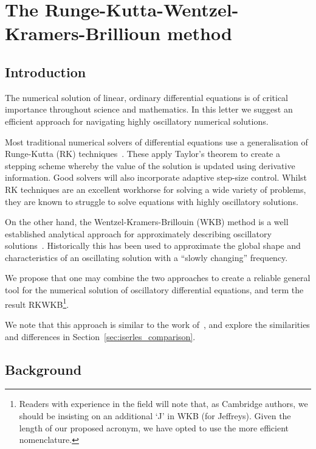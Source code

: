 

\chapter[RKWKB]{The Runge-Kutta-Wentzel-Kramers-Brillioun method}
\label{chap:RK}

\section{Introduction}
\label{sec:introduction}
The numerical solution of linear, ordinary differential equations is of critical importance throughout science and mathematics. In this letter we suggest an efficient approach for navigating highly oscillatory numerical solutions.

Most traditional numerical solvers of differential equations use a generalisation of Runge-Kutta (RK) techniques~\citep{Press+2007}. These apply Taylor's theorem to create a stepping scheme whereby the value of the solution is updated using derivative information. Good solvers will also incorporate adaptive step-size control.
Whilst RK techniques are an excellent workhorse for solving a wide variety of problems, they are known to struggle to solve equations with highly oscillatory solutions.

On the other hand, the Wentzel-Kramers-Brillouin (WKB) method is a well established analytical approach for approximately describing oscillatory solutions~\citep{RHB,Bender+2010}. Historically this has been used to approximate the global shape and characteristics of an oscillating solution with a ``slowly changing'' frequency.

We propose that one may combine the two approaches to create a reliable general tool for the numerical solution of oscillatory differential equations, and term the result RKWKB\footnote{Readers with experience in the field will note that, as Cambridge authors, we should be insisting on an additional `J' in WKB (for Jeffreys). Given the length of our proposed acronym, we have opted to use the more efficient nomenclature.}.

We note that this approach is similar to the work of~\cite{Iserles02globalerror,Iserles01thinkglobally}, and explore the similarities and differences in Section~\ref{sec:iserles_comparison}.


\section{Background}

